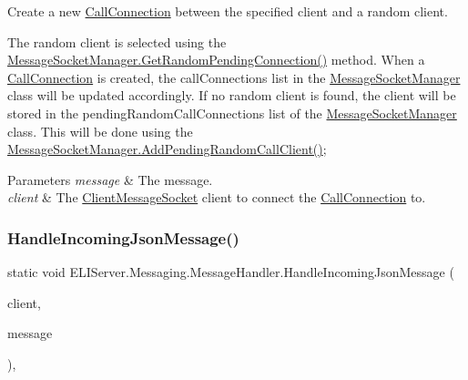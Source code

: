 Create a new \hyperlink{class_e_l_i_server_1_1_call_connection}{Call\+Connection} between the specified client and a random client.

The random client is selected using the \hyperlink{class_e_l_i_server_1_1_message_socket_manager_a6988d1ee0c08ded66a3d428f04585716}{Message\+Socket\+Manager.\+Get\+Random\+Pending\+Connection()} method. When a \hyperlink{class_e_l_i_server_1_1_call_connection}{Call\+Connection} is created, the call\+Connections list in the \hyperlink{class_e_l_i_server_1_1_message_socket_manager}{Message\+Socket\+Manager} class will be updated accordingly. If no random client is found, the client will be stored in the pending\+Random\+Call\+Connections list of the \hyperlink{class_e_l_i_server_1_1_message_socket_manager}{Message\+Socket\+Manager} class. This will be done using the \hyperlink{class_e_l_i_server_1_1_message_socket_manager_ac2dffa438503f596446e4a0137582962}{Message\+Socket\+Manager.\+Add\+Pending\+Random\+Call\+Client()}; 


\begin{DoxyParams}{Parameters}
{\em message} & The message.\\
\hline
{\em client} & The \hyperlink{class_e_l_i_server_1_1_messaging_1_1_client_message_socket}{Client\+Message\+Socket} client to connect the \hyperlink{class_e_l_i_server_1_1_call_connection}{Call\+Connection} to.\\
\hline
\end{DoxyParams}
\mbox{\label{class_e_l_i_server_1_1_messaging_1_1_message_handler_a54b8fc68511fe197932338c0ffdb75c0}} 
\subsubsection{\texorpdfstring{Handle\+Incoming\+Json\+Message()}{HandleIncomingJsonMessage()}}
{\footnotesize\ttfamily static void E\+L\+I\+Server.\+Messaging.\+Message\+Handler.\+Handle\+Incoming\+Json\+Message (\begin{DoxyParamCaption}\item[{\hyperlink{class_e_l_i_server_1_1_messaging_1_1_client_message_socket}{Client\+Message\+Socket}}]{client,  }\item[{String}]{message }\end{DoxyParamCaption})\hspace{0.3cm}{\ttfamily [inline]}, {\ttfamily [static]}}





